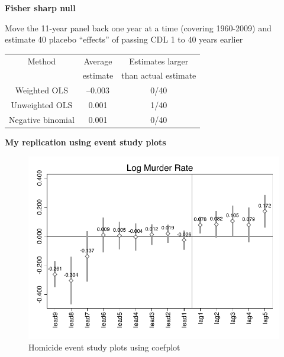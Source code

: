\documentclass[notes=show]{beamer}
\begin{document}
\begin{frame}[plain]
	\begin{center}
	\textbf{Fisher sharp null}
	\end{center}
	
Move the 11-year panel back one year at a time (covering 1960-2009) and estimate 40 placebo ``effects'' of passing CDL 1 to 40 years earlier


	\begin{table}
	\begin{tabular}{ccc}
	\hline
	\multicolumn{1}{c}{Method}&
	\multicolumn{1}{c}{Average }&
	\multicolumn{1}{c}{Estimates larger }\\
	\multicolumn{1}{c}{}&
	\multicolumn{1}{c}{estimate}&
	\multicolumn{1}{c}{than actual estimate}\\
	\hline
	Weighted OLS & --0.003 & 0/40\\
	Unweighted OLS & 0.001 & 1/40 \\
	Negative binomial & 0.001 & 0/40 \\
	\hline
	\end{tabular}
	\end{table}

\end{frame}

\begin{frame}[plain]
\begin{center}
\textbf{My replication using event study plots}
\end{center}

	\begin{figure}
	\includegraphics[scale=0.5]{./lecture_includes/event_cheng1.pdf}
	\caption{Homicide event study plots using coefplot}
	\end{figure}

\end{frame}
\end{document}
